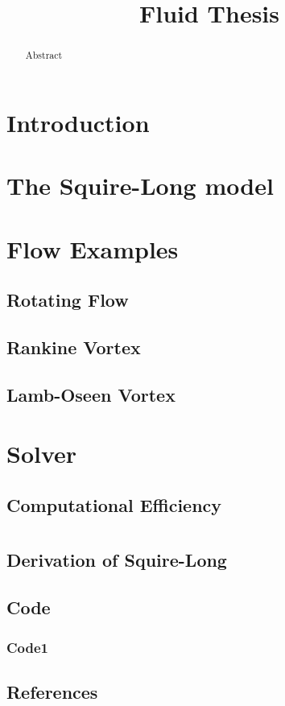 \documentclass{X:/Documents/Coding/Latex/myreport}
\title{Fluid Thesis}
\begin{document}
\maketitle
\begin{abstract}
	Abstract
\end{abstract}
\chapter{Introduction}

\chapter{The Squire-Long model}
%

\chapter{Flow Examples}
\section{Rotating Flow}
\section{Rankine Vortex}
\section{Lamb-Oseen Vortex}

\chapter{Solver}

\section{Computational Efficiency}

\appendix

\chapter{}
\section{Derivation of Squire-Long}
\section{Code}
\subsection{Code1}
\section{References}
\end{document}
